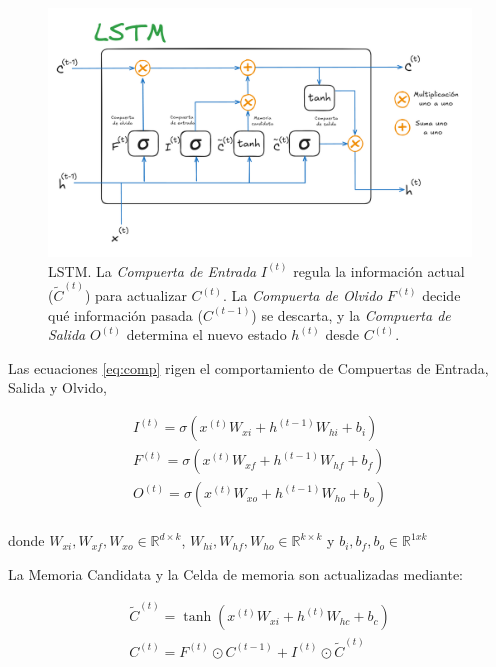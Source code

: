 \begin{figure}[ht!]
\centering
\includegraphics[width=1.0 \textwidth]{Chapters/2. Transformer/Figures/rnn/LSTM.png}
\caption{LSTM. La \textit{Compuerta de Entrada} $I^{(t)}$ regula la información actual ($\tilde{C}^{(t)}$)
         para actualizar $C^{(t)}$. La \textit{Compuerta de Olvido} $F^{(t)}$ decide qué información
         pasada ($C^{(t-1)}$) se descarta, y la \textit{Compuerta de Salida} $O^{(t)}$ determina el
         nuevo estado $h^{(t)}$ desde $C^{(t)}$.}
\label{fig:rnn_lstm}
\end{figure}

Las ecuaciones \ref{eq:comp} rigen el comportamiento de Compuertas de Entrada, Salida y Olvido,

\begin{equation}
    \begin{split}
        I^{(t)} =  \sigma(x^{(t)} W_{xi} + h^{(t-1)} W_{hi} + b_i)\\
        F^{(t)} =  \sigma(x^{(t)} W_{xf} + h^{(t-1)} W_{hf} + b_f)\\
        O^{(t)} =  \sigma(x^{(t)} W_{xo} + h^{(t-1)} W_{ho} + b_o)\\
    \end{split}
    \label{eq:comp}
\end{equation}

\noindent donde $W_{xi}, W_{xf}, W_{xo} \in \mathbb{R}^{d \times k}$,
$W_{hi}, W_{hf}, W_{ho} \in \mathbb{R}^{k \times k}$ y $b_i, b_f, b_o \in \mathbb{R}^{1xk}$

La Memoria Candidata y la Celda de memoria son actualizadas mediante:

\begin{equation}
    \begin{split}
        \tilde C^{(t)} =  \tanh(x^{(t)} W_{xi} + h^{(t)} W_{hc} + b_c)\\
        C^{(t)} =  F^{(t)} \odot C^{(t-1)} + I^{(t)} \odot \tilde C^{(t)} \\
    \end{split}
\end{equation}

